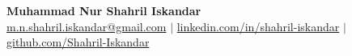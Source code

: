 \documentclass[../main.tex]{subfiles}
\begin{document}
\begin{center}
    \textbf{\fontsize{14}{14}\selectfont Muhammad Nur Shahril Iskandar} \\ \vspace{3pt}
    \small
    \faEnvelope \hspace{.5pt} \href{mailto:}{m.n.shahril.iskandar@gmail.com}
    $|$
    \faLinkedin \hspace{.5pt} \href{https://www.linkedin.com/in/shahril-iskandar}{linkedin.com/in/shahril-iskandar}
    $|$
    \faGithub \hspace{.5pt} \href{https://github.com/Shahril-Iskandar}{github.com/Shahril-Iskandar}
\end{center}
\end{document}
